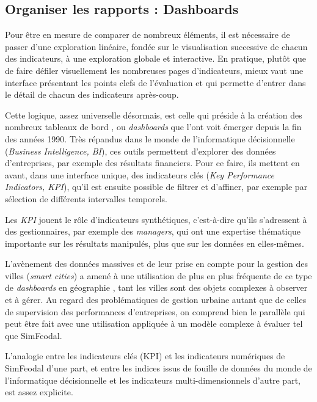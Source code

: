 	\subsection{Organiser les rapports : Dashboards}
	
	Pour être en mesure de comparer de nombreux éléments, il est nécessaire de passer d'une exploration linéaire, fondée sur le visualisation successive de chacun des indicateurs, à une exploration globale et interactive.
	En pratique, plutôt que de faire défiler visuellement les nombreuses pages d'indicateurs, mieux vaut une interface présentant les points clefs de l'évaluation et qui permette d'entrer dans le détail de chacun des indicateurs après-coup.

	Cette logique, assez universelle désormais, est celle qui préside à la création des nombreux \og tableaux de bord \fg{}, ou \og \textit{dashboards} \fg{} que l'ont voit émerger depuis la fin des années 1990.
	Très répandus dans le monde de l'informatique décisionnelle (\textit{Business Intelligence, BI}), ces outils permettent d'explorer des données d'entreprises, par exemple des résultats financiers. Pour ce faire, ils mettent en avant, dans une interface unique, des indicateurs clés (\textit{Key Performance Indicators, KPI}), qu'il est ensuite possible de filtrer et d'affiner, par exemple par sélection de différents intervalles temporels.

	Les \textit{KPI} jouent le rôle d'indicateurs synthétiques, c'est-à-dire qu'ils s'adressent à des gestionnaires, par exemple des \textit{managers}, qui ont une expertise thématique importante sur les résultats manipulés, plus que sur les données en elles-mêmes.  
	
	L'avènement des données massives et de leur prise en compte pour la gestion des villes (\textit{smart cities}) a amené à une utilisation de plus en plus fréquente de ce type de \textit{dashboards} en géographie \autocite{roumpani_creating_2013, kitchin_knowing_2015, batty_perspective_2015}, tant les villes sont des objets complexes à observer et à gérer.
	Au regard des problématiques de gestion urbaine autant que de celles de supervision des performances d'entreprises, on comprend bien le parallèle qui peut être fait avec une utilisation appliquée à un modèle complexe à évaluer tel que SimFeodal.

	L'analogie entre les indicateurs clés (KPI) et les indicateurs numériques de SimFeodal d'une part, et entre les indices issus de fouille de données du monde de l'informatique décisionnelle et les indicateurs multi-dimensionnels d'autre part, est assez explicite.

